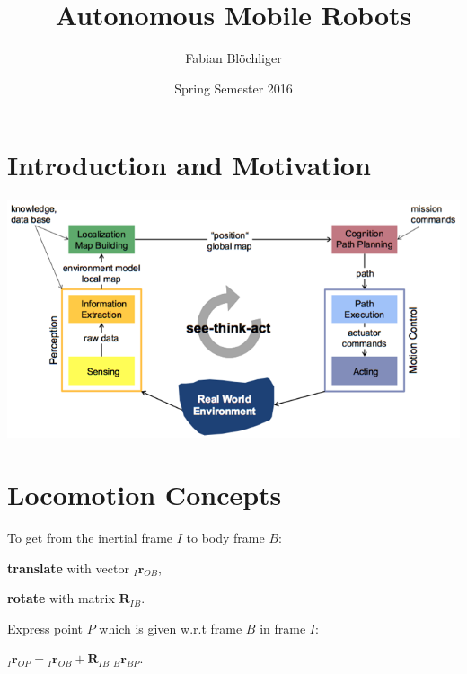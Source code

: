\documentclass[8pt,landscape]{article}
\begin{document}
\renewcommand{\labelitemi}{--}
\pagestyle{empty}
\raggedright
\setlength{\columnsep}{2mm}
\setlength{\columnseprule}{0.1mm}
\begin{multicols}{3}
\title{\textbf{Autonomous Mobile Robots}}
\author{Fabian Blöchliger}
\date{Spring Semester 2016}
\maketitle


\section{Introduction and Motivation}

\includegraphics[width=\columnwidth]{img/1_SeeThinkAct.png}

\section{Locomotion Concepts}

To get from the inertial frame $I$ to body frame $B$:
\begin{compactitem}
\item \textbf{translate} with vector ${}_I\mathbf{r}_{OB}$,
\item \textbf{rotate} with matrix $\mathbf{R}_{IB}$.
\end{compactitem}

\vspace{5pt}

Express point $P$ which is given w.r.t frame $B$ in frame $I$:

\vspace{-5pt}
\begin{center}
${}_I\mathbf{r}_{OP} = {}_I\mathbf{r}_{OB} +
\mathbf{R}_{IB}\;{}_B\mathbf{r}_{BP}$.
\end{center}


\end{multicols}
\end{document}
